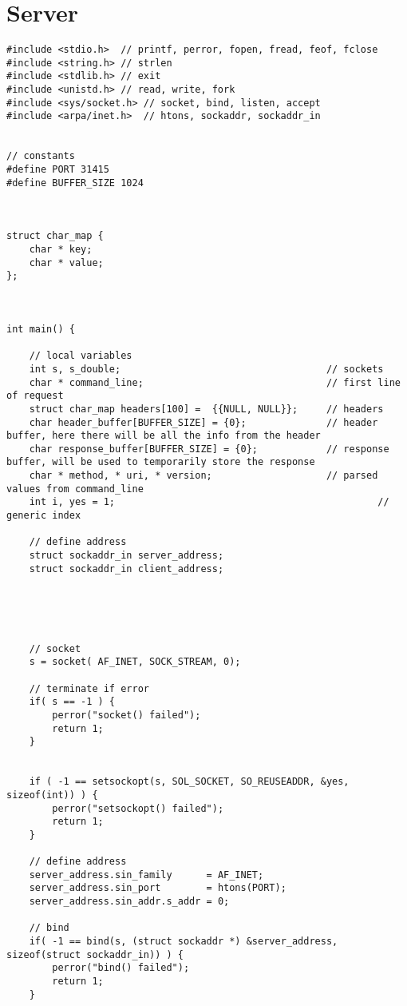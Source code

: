 \section{Server}

\begin{lstlisting}
#include <stdio.h>  // printf, perror, fopen, fread, feof, fclose
#include <string.h> // strlen
#include <stdlib.h> // exit
#include <unistd.h> // read, write, fork
#include <sys/socket.h> // socket, bind, listen, accept
#include <arpa/inet.h>  // htons, sockaddr, sockaddr_in


// constants
#define PORT 31415
#define BUFFER_SIZE 1024



struct char_map {
    char * key;
    char * value;
};



int main() {

    // local variables
    int s, s_double;                                    // sockets
    char * command_line;                                // first line of request
    struct char_map headers[100] =  {{NULL, NULL}};     // headers
    char header_buffer[BUFFER_SIZE] = {0};              // header buffer, here there will be all the info from the header
    char response_buffer[BUFFER_SIZE] = {0};            // response buffer, will be used to temporarily store the response
    char * method, * uri, * version;                    // parsed values from command_line
    int i, yes = 1;                                              // generic index

    // define address
    struct sockaddr_in server_address;
    struct sockaddr_in client_address;





    // socket
    s = socket( AF_INET, SOCK_STREAM, 0);

    // terminate if error
    if( s == -1 ) {
        perror("socket() failed");
        return 1;
    }


    if ( -1 == setsockopt(s, SOL_SOCKET, SO_REUSEADDR, &yes, sizeof(int)) ) {
        perror("setsockopt() failed");
        return 1;
    }
    
    // define address
    server_address.sin_family      = AF_INET;
    server_address.sin_port        = htons(PORT);
    server_address.sin_addr.s_addr = 0;

    // bind
    if( -1 == bind(s, (struct sockaddr *) &server_address, sizeof(struct sockaddr_in)) ) {
        perror("bind() failed");
        return 1;
    }


\end{lstlisting}
